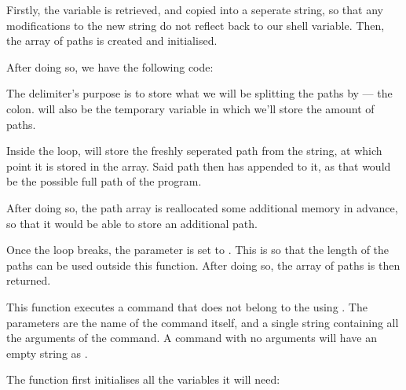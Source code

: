 \documentclass[12pt, a4paper]{report}
\begin{document}
                Firstly, the  variable is retrieved, and copied
                into a seperate string, so that any modifications to the
                new string do not reflect back to our shell variable.
                Then, the array of paths is created and initialised.

                After doing so, we have the following code:

                \begingroup
                    \fontsize{10pt}{10pt}\selectfont
                \endgroup

                The delimiter's purpose is to store what we will be splitting
                the paths by --- the colon.  will also be the
                temporary variable in which we'll store the amount of paths.

                Inside the loop,  will store the freshly seperated
                path from the  string, at which point it is stored
                in the  array. Said path then has 
                appended to it, as that would be the possible full path of the 
                program.

                After doing so, the path array is reallocated some additional
                memory in advance, so that it would be able to store an additional
                path. 

                Once the loop breaks, the parameter  is set to
                . This is so that the length of the paths can be used
                outside this function. After doing so, the array of paths is then
                returned.

                This function executes a command that does not belong to the
                 using . The parameters are the name 
                of the command itself, and a single string containing all the 
                arguments of the command. A command with no arguments will have 
                an empty string as .

                The function first initialises all the variables it will need:

                \begingroup
                \fontsize{10pt}{10pt}\selectfont
                \endgroup\\
\end{document}

